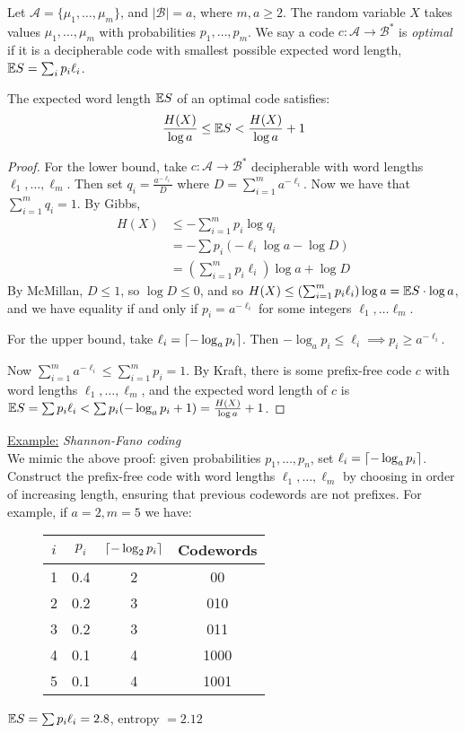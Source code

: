 \documentclass[10pt,a4paper]{article}
\begin{document}
Let $\mathscr{A} = \{\mu_1, \ldots, \mu_m\}$, and $|\mathscr{B}| = a$, where $m, a\geq 2$. The random variable $X$ takes values $\mu_1, \ldots, \mu_m$ with probabilities $p_1, \ldots, p_m$. We say a code $c:\mathscr{A} \to \mathscr{B}^{\ast}$ is \emph{optimal} if it is a decipherable code with smallest possible expected word length, $\mathbb{E} S = \sum_i p_i \ell_i$.

\begin{theorem}
The expected word length $\mathbb{E} S$ of an optimal code satisfies:
\begin{align*}
\frac{H(X)}{\log a} \leq \mathbb{E} S < \frac{H(X)}{\log a}+1
\end{align*}
\end{theorem}
\begin{proof}
For the lower bound, take $c: \mathscr{A} \to \mathscr{B}^{\ast}$ decipherable with word lengths $\ell_1, \ldots, \ell_m$. Then set $q_i = \frac{a^{-\ell_i}}{D}$ where $D = \sum_{i=1}^m a^{-\ell_i}$. Now we have that $\sum_{i=1}^m q_i = 1$. By Gibbs,
\begin{align*}
H(X) &\leq -\sum_{i=1}^m p_i \log q_i\\
&= -\sum p_i\left(-\ell_i \log a - \log D\right)\\
&= \left(\sum_{i=1}^m p_i \ell_i\right) \log a + \log D
\end{align*}
By McMillan, $D \leq 1$, so $\log D \leq 0$, and so $H(X) \leq \left(\sum_{i=1}^m p_i \ell_i\right) \log a = \mathbb{E} S \cdot \log a$, and we have equality if and only if $p_i = a^{-\ell_i}$ for some integers $\ell_1, \ldots \ell_m$.

For the upper bound, take $\ell_i = \lceil -\log_a p_i \rceil$. Then $-\log_a p_i \leq \ell_i \implies p_i \geq a^{-\ell_i}$.

Now $\sum_{i=1}^m a^{-\ell_i} \leq \sum_{i=1}^m p_i = 1$. By Kraft, there is some prefix-free code $c$ with word lengths $\ell_1, \ldots, \ell_m$, and the expected word length of $c$ is $\mathbb{E} S = \sum p_i \ell_i < \sum p_i (-\log_a p_i + 1) = \frac{H(X)}{\log a} + 1$.
\end{proof}

\hspace*{-1em}\underline{Example:} \emph{Shannon-Fano coding}\\
We mimic the above proof: given probabilities $p_1, \ldots, p_n$, set $\ell_i = \lceil -\log_a p_i \rceil$. Construct the prefix-free code with word lengths $\ell_1, \ldots, \ell_m$ by choosing in order of increasing length, ensuring that previous codewords are not prefixes. For example, if $a = 2, m = 5$ we have:\\
\begin{figure}[H]
\centering
\begin{tabular}{c|c|c|c}
$i$ & $p_i$ & $\lceil -\log_2 p_i \rceil$ & Codewords \\\hline
1 & 0.4 & 2 & 00 \\
2 & 0.2 & 3 & 010\\
3 & 0.2 & 3 & 011\\
4 & 0.1 & 4 & 1000\\
5 & 0.1 & 4 & 1001
\end{tabular}
\end{figure}
$\mathbb{E} S = \sum p_i \ell_i = 2.8$, entropy $= 2.12$
\end{document}
